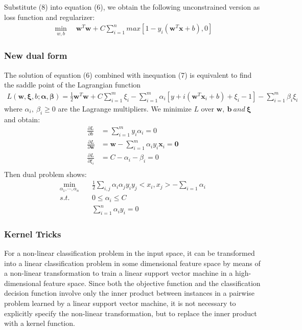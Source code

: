 \documentclass{article}
\newcommand{\upcite}[1]{\textsuperscript{\textsuperscript{\cite{#1}}}}
\begin{document}
\begin{spacing}{1.5}
Substitute (8) into equation (6), we obtain the following unconstrained version as loss function and regularizer:
\begin{align}
\min_{w,b}\quad \bm{w}^T\bm{w}+C\sum^n_{i=1}max[1-y_i(\bm{w}^T\bm{x}+b),0]
\end{align}

\subsubsection{New dual form}
The solution of equation (6) combined with inequation (7) is equivalent to find the saddle point of the Lagrangian function
\begin{align}
L(\bm{w},\bm{\xi},b; \bm{\alpha},\bm{\beta})=\frac{1}{2}\bm{w}^T\bm{w}+C\sum^m_{i=1}\xi_i-\sum^m_{i=1}\alpha_i[y+i(\bm{w}^T\bm{x}_i+b)+\xi_i-1]-\sum^m_{i=1}\beta_i\xi_i
\end{align}
where $\alpha_i,\ \beta_i\ge0$ are the Lagrange multipliers.
We minimize $L$ over $\bm{w},\ \bm{b}\ and\ \bm{\xi}$ and obtain:
\begin{align}
\frac{\partial L}{\partial b}&=\sum^m_{i=1}y_i\alpha_i=0\\
\frac{\partial L}{\partial \bm{w}}&=\bm{w}-\sum^m_{i=1}\alpha_i y_i\bm{x}_i=\bm{0}\\
\frac{\partial L}{\partial\xi_i}&=C-\alpha_i-\beta_i=0
\end{align}
Then dual problem shows\upcite{Ref2}:
\begin{align}
\min_{\alpha_1,\cdots,\alpha_n}&\quad \frac{1}{2}\sum_{i,j}\alpha_i\alpha_jy_iy_j<x_i,x_j>-\sum_{i=1}\alpha_i\\
s.t.&\quad 0\le\alpha_i\le C\\
&\quad \sum^n_{i=1}\alpha_iy_i=0
\end{align}

\subsubsection{Kernel Tricks}
For a non-linear classification problem in the input space, it can be transformed into a linear classification problem in some dimensional feature space by means of a non-linear transformation to train a linear support vector machine in a high-dimensional feature space. Since both the objective function and the classification decision function involve only the inner product between instances in a pairwise problem learned by a linear support vector machine, it is not necessary to explicitly specify the non-linear transformation, but to replace the inner product with a kernel function. \par


\end{spacing}
\end{document}
